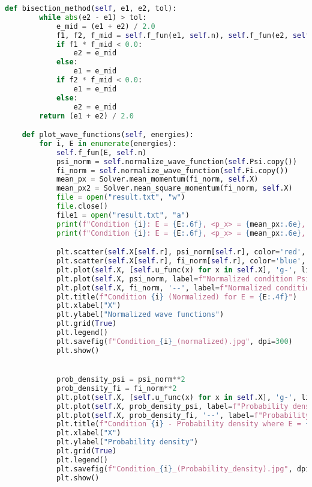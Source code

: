 \begin{lstlisting}[language=Python, caption=Код файла solver.py,label={lst:solver}]
    def bisection_method(self, e1, e2, tol):
        while abs(e2 - e1) > tol:
            e_mid = (e1 + e2) / 2.0
            f1, f2, f_mid = self.f_fun(e1, self.n), self.f_fun(e2, self.n), self.f_fun(e_mid, self.n)
            if f1 * f_mid < 0.0:
                e2 = e_mid
            else:
                e1 = e_mid
            if f2 * f_mid < 0.0:
                e1 = e_mid
            else:
                e2 = e_mid
        return (e1 + e2) / 2.0

    def plot_wave_functions(self, energies):
        for i, E in enumerate(energies):
            self.f_fun(E, self.n)
            psi_norm = self.normalize_wave_function(self.Psi.copy())
            fi_norm = self.normalize_wave_function(self.Fi.copy())
            mean_px = Solver.mean_momentum(fi_norm, self.X)
            mean_px2 = Solver.mean_square_momentum(fi_norm, self.X)
            file = open("result.txt", "w")
            file.close()
            file1 = open("result.txt", "a")
            print(f"Condition {i}: E = {E:.6f}, <p_x> = {mean_px:.6e}, <p_x^2> = {mean_px2:.6e}")
            print(f"Condition {i}: E = {E:.6f}, <p_x> = {mean_px:.6e}, <p_x^2> = {mean_px2:.6e}", file = file1)

            plt.scatter(self.X[self.r], psi_norm[self.r], color='red', s=50, zorder=5)  # Point at Psi
            plt.scatter(self.X[self.r], fi_norm[self.r], color='blue', s=50, zorder=5)  # Point at Fi
            plt.plot(self.X, [self.u_func(x) for x in self.X], 'g-', linewidth=6.0, label="U(x)")
            plt.plot(self.X, psi_norm, label=f"Normalized condition Psi {i}")
            plt.plot(self.X, fi_norm, '--', label=f"Normalized condition Phi {i}")
            plt.title(f"Condition {i} (Normalized) for E = {E:.4f}")
            plt.xlabel("X")
            plt.ylabel("Normalized wave functions")
            plt.grid(True)
            plt.legend()
            plt.savefig(f"Condition_{i}_(normalized).jpg", dpi=300)
            plt.show()


            prob_density_psi = psi_norm**2
            prob_density_fi = fi_norm**2
            plt.plot(self.X, [self.u_func(x) for x in self.X], 'g-', linewidth=6.0, label="U(x)")
            plt.plot(self.X, prob_density_psi, label=f"Probability density Psi condition {i+1}")
            plt.plot(self.X, prob_density_fi, '--', label=f"Probability Density Phi condition {i+1}")
            plt.title(f"Condition {i} - Probability density where E = {E:.4f}")
            plt.xlabel("X")
            plt.ylabel("Probability density")
            plt.grid(True)
            plt.legend()
            plt.savefig(f"Condition_{i}_(Probability_density).jpg", dpi=300)
            plt.show()



\end{lstlisting}
